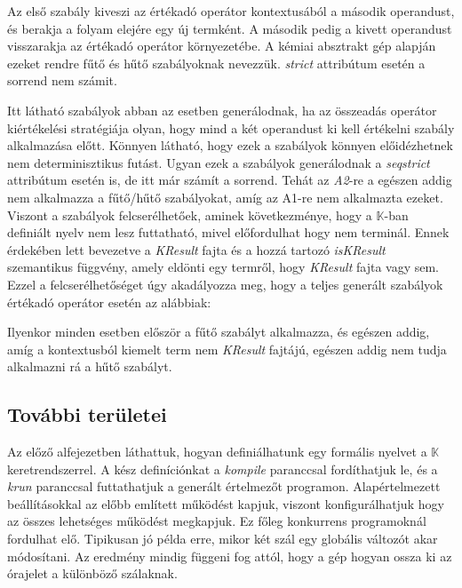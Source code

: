 

Az első szabály kiveszi az értékadó operátor kontextusából a második operandust, és berakja a folyam elejére egy új termként. A második pedig a kivett operandust visszarakja az értékadó operátor környezetébe. A kémiai absztrakt gép alapján ezeket rendre fűtő és hűtő szabályoknak nevezzük. \textit{strict} attribútum esetén a sorrend nem számit.



Itt látható szabályok abban az esetben generálodnak, ha az összeadás operátor kiértékelési stratégiája olyan, hogy mind a két operandust ki kell értékelni szabály alkalmazása előtt. Könnyen látható, hogy ezek a szabályok könnyen előidézhetnek nem determinisztikus futást. Ugyan ezek a szabályok generálodnak a \textit{seqstrict} attribútum esetén is, de itt már számít a sorrend. Tehát az \textit{A2}-re a egészen addig nem alkalmazza a fűtő/hűtő szabályokat, amíg az A1-re nem alkalmazta ezeket. Viszont a szabályok felcserélhetőek, aminek következménye, hogy a $\mathbb{K}$-ban definiált nyelv nem lesz futtatható, mivel előfordulhat hogy nem terminál. Ennek érdekében lett bevezetve a \textit{KResult} fajta és a hozzá tartozó \textit{isKResult} szemantikus függvény, amely eldönti egy termről, hogy \textit{KResult} fajta vagy sem. Ezzel a felcserélhetőséget úgy akadályozza meg, hogy a teljes generált szabályok értékadó operátor esetén az alábbiak:



Ilyenkor minden esetben először a fűtő szabályt alkalmazza, és egészen addig, amíg a kontextusból kiemelt term nem \textit{KResult} fajtájú, egészen addig nem tudja alkalmazni rá a hűtő szabályt.

\subsection{További területei}

Az előző alfejezetben láthattuk, hogyan definiálhatunk egy formális nyelvet a $\mathbb{K}$ keretrendszerrel. A kész definíciónkat a \textit{kompile} paranccsal fordíthatjuk le, és a \textit{krun} paranccsal futtathatjuk a generált értelmezőt programon. Alapértelmezett beállításokkal az előbb említett működést kapjuk, viszont konfigurálhatjuk hogy az összes lehetséges működést megkapjuk. Ez főleg konkurrens programoknál fordulhat elő. Tipikusan jó példa erre, mikor két szál egy globális változót akar módosítani. Az eredmény mindig függeni fog attól, hogy a gép hogyan ossza ki az órajelet a különböző szálaknak.

